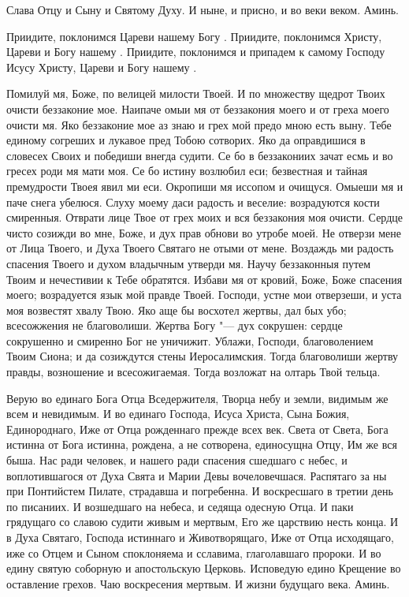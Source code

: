 \begin{mymulticols}


Слава Отцу и Сыну и Святому Духу. И ныне, и присно, и во веки веком. Аминь.




Приидите, поклонимся Цареви нашему Богу . Приидите, поклонимся Христу, Цареви и Богу нашему . Приидите, поклонимся и припадем к самому Господу Исусу Христу, Цареви и Богу нашему . 




Помилуй мя, Боже, по велицей милости Твоей. И по множеству щедрот Твоих очисти беззаконие мое. Наипаче омыи мя от беззакония моего и от греха моего очисти мя. Яко беззаконие мое аз знаю и грех мой предо мною есть выну. Тебе единому согреших и лукавое пред Тобою сотворих. Яко да оправдишися в словесех Своих и победиши внегда судити. Се бо в беззакониих зачат есмь и во гресех роди мя мати моя. Се бо истину возлюбил еси; безвестная и тайная премудрости Твоея явил ми еси. Окропиши мя иссопом и очищуся. Омыеши мя и паче снега убелюся. Слуху моему даси радость и веселие: возрадуются кости смиренныя. Отврати лице Твое от грех моих и вся беззакония моя очисти. Сердце чисто созижди во мне, Боже, и дух прав обнови во утробе моей. Не отверзи мене от Лица Твоего, и Духа Твоего Святаго не отыми от мене. Воздаждь ми радость спасения Твоего и духом владычным утверди мя. Научу беззаконныя путем Твоим и нечестивии к Тебе обратятся. Избави мя от кровий, Боже, Боже спасения моего; возрадуется язык мой правде Твоей. Господи, устне мои отверзеши, и уста моя возвестят хвалу Твою. Яко аще бы восхотел жертвы, дал бых убо; всесожжения не благоволиши. Жертва Богу "--- дух сокрушен: сердце сокрушенно и смиренно Бог не уничижит. Ублажи, Господи, благоволением Твоим Сиона; и да созиждутся стены Иеросалимския. Тогда благоволиши жертву правды, возношение и всесожигаемая. Тогда возложат на олтарь Твой тельца. 



Верую во единаго Бога Отца Вседержителя, Творца небу и земли, видимым же всем и невидимым. И во единаго Господа, Исуса Христа, Сына Божия, Единороднаго, Иже от Отца рожденнаго прежде всех век. Света от Света, Бога истинна от Бога истинна, рождена, а не сотворена, единосущна Отцу, Им же вся быша. Нас ради человек, и нашего ради спасения сшедшаго с небес, и воплотившагося от Духа Свята и Марии Девы вочеловечшася. Распятаго за ны при Понтийстем Пилате, страдавша и погребенна. И воскресшаго в третии день по писаниих. И возшедшаго на небеса, и седяща одесную Отца. И паки грядущаго со славою судити живым и мертвым, Его же царствию несть конца. И в Духа Святаго, Господа истиннаго и Животворящаго, Иже от Отца исходящаго, иже со Отцем и Сыном споклоняема и сславима, глаголавшаго пророки. И во едину святую соборную и апостольскую Церковь. Исповедую едино Крещение во оставление грехов. Чаю воскресения мертвым. И жизни будущаго века. Аминь.



\end{mymulticols}
